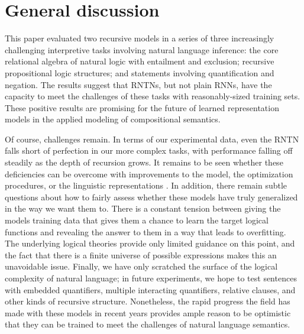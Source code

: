 \section{General discussion}\label{sec:discussion}

This paper evaluated two recursive models in a series of three increasingly
challenging interpretive tasks involving natural language inference:
the core relational algebra of natural logic with entailment and
exclusion; recursive propositional logic structures; and statements
involving quantification and negation. The results suggest that RNTNs,
but not plain RNNs, have the capacity to meet the challenges of these
tasks with reasonably-sized training sets. These positive results are
promising for the future of learned representation models in the
applied modeling of compositional semantics.

Of course, challenges remain. In terms of our experimental data, even
the RNTN falls short of perfection in our more complex tasks, with
performance falling off steadily as the depth of recursion grows. It
remains to be seen whether these deficiencies can be overcome with
improvements to the model, the optimization procedures, or the
linguistic representations
\cite{sochergrounded,kalchbrenner2014convolutional}. In addition,
there remain subtle questions about how to fairly assess whether these
models have truly generalized in the way we want them to. There is a
constant tension between giving the models training data that gives
them a chance to learn the target logical functions and revealing the
answer to them in a way that leads to overfitting. The underlying
logical theories provide only limited guidance on this point, and the fact that 
there is a finite universe of possible expressions makes this an unavoidable issue. 
Finally, we have only scratched the surface of the logical complexity of
natural language; in future experiments, we hope to test sentences
with embedded quantifiers, multiple interacting quantifiers, relative
clauses, and other kinds of recursive structure. Nonetheless, the
rapid progress the field has made with these models in recent years
provides ample reason to be optimistic that they can be trained to
meet the challenges of natural language semantics.


